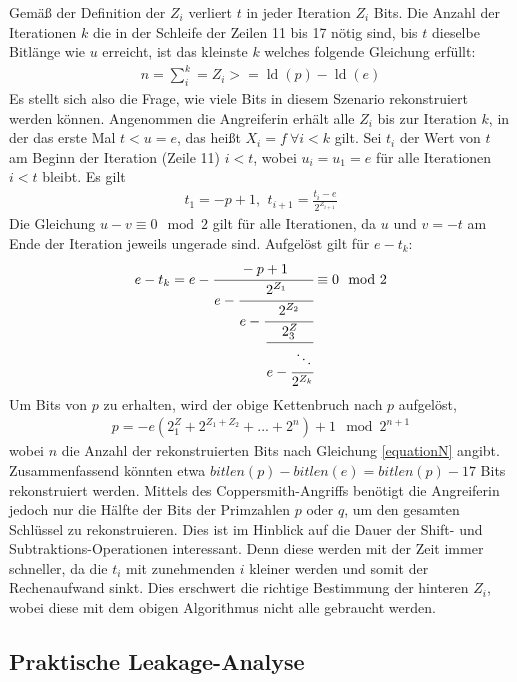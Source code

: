 Gemäß der Definition der $Z_i$ verliert $t$ in jeder Iteration $Z_i$ Bits. 
Die Anzahl der Iterationen $k$ die in der Schleife der Zeilen 11 bis 17 nötig sind, bis $t$ dieselbe Bitlänge wie $u$ erreicht, ist das kleinste $k$ welches folgende Gleichung erfüllt: 
\begin{align}
\label{equationN}
n = \sum\limits_i^k = Z_i >= \operatorname{ld}(p) - \operatorname{ld}(e)
\end{align}
Es stellt sich also die Frage, wie viele Bits in diesem Szenario rekonstruiert werden können.
Angenommen die Angreiferin erhält alle $Z_i$ bis zur Iteration $k$, in der das erste Mal $t<u=e$, das heißt $X_i=f \: \forall i < k$ gilt.
Sei $t_i$ der Wert von $t$ am Beginn der Iteration (Zeile 11) $i<t$, wobei $u_i=u_1=e$ für alle Iterationen $i<t$ bleibt.
Es gilt 
\begin{align}
t_1=-p+1 \text{, } \: t_{i+1} = \frac{t_i - e}{2^{Z_{i+1}}}
\end{align}
Die Gleichung $u-v \equiv 0 \mod 2$ gilt für alle Iterationen, da $u$ und $v=-t$ am Ende der Iteration jeweils ungerade sind.
Aufgelöst gilt für $e-t_k$:
\begin{align}
e-t_k = e- \cfrac{-p+1}{e - \cfrac{2^{Z_1}}{e- \cfrac{2^{Z_2}}{
          \cfrac{2^Z_3}{e - \cfrac{\ddots}{2^{Z_k}}}}}} \equiv 0 \mod 2
\end{align}
Um Bits von $p$ zu erhalten, wird der obige Kettenbruch nach $p$ aufgelöst,
\begin{align}
p = -e(2^Z_1+2^{Z_1+Z_2}+...+2^n)+1 \mod 2^{n+1}
\end{align}
wobei $n$ die Anzahl der rekonstruierten Bits nach Gleichung \ref{equationN} angibt.
Zusammenfassend könnten etwa $bitlen(p)-bitlen(e)=bitlen(p)-17$ Bits rekonstruiert werden.
Mittels des Coppersmith-Angriffs \cite{CoppersmithBound} benötigt die Angreiferin jedoch nur die Hälfte der Bits der Primzahlen $p$ oder $q$, um den gesamten Schlüssel zu rekonstruieren.
Dies ist im Hinblick auf die Dauer der Shift- und Subtraktions-Operationen interessant. 
Denn diese werden mit der Zeit immer schneller, da die $t_i$ mit zunehmenden $i$ kleiner werden und somit der Rechenaufwand sinkt.
Dies erschwert die richtige Bestimmung der hinteren $Z_i$, wobei diese mit dem obigen Algorithmus nicht alle gebraucht werden.

\subsection{Praktische Leakage-Analyse}
\label{PracticalLeakageAnalysis}

